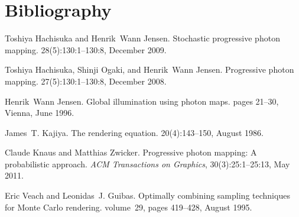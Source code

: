 \chapter{Bibliography}
\hypertarget{citelist}{}\label{citelist}

\begin{DoxyDescription}
\item[\label{citelist_CITEREF_Hachisuka:2009:Stochastic}%
\Hypertarget{citelist_CITEREF_Hachisuka:2009:Stochastic}%
\mbox{[}1\mbox{]}]Toshiya Hachisuka and Henrik~Wann Jensen. Stochastic progressive photon mapping. 28(5)\+:130\+:1--130\+:8, December 2009. 


\item[\label{citelist_CITEREF_Hachisuka:2008:Progressive}%
\Hypertarget{citelist_CITEREF_Hachisuka:2008:Progressive}%
\mbox{[}2\mbox{]}]Toshiya Hachisuka, Shinji Ogaki, and Henrik~Wann Jensen. Progressive photon mapping. 27(5)\+:130\+:1--130\+:8, December 2008. 


\item[\label{citelist_CITEREF_Jensen:1996:Global}%
\Hypertarget{citelist_CITEREF_Jensen:1996:Global}%
\mbox{[}3\mbox{]}]Henrik~Wann Jensen. Global illumination using photon maps. pages 21--30, Vienna, June 1996. 


\item[\label{citelist_CITEREF_Kajiya:1986:Rendering}%
\Hypertarget{citelist_CITEREF_Kajiya:1986:Rendering}%
\mbox{[}4\mbox{]}]James~T. Kajiya. The rendering equation. 20(4)\+:143--150, August 1986. 


\item[\label{citelist_CITEREF_Knaus:2011:Progressive}%
\Hypertarget{citelist_CITEREF_Knaus:2011:Progressive}%
\mbox{[}5\mbox{]}]Claude Knaus and Matthias Zwicker. Progressive photon mapping\+: A probabilistic approach. {\itshape ACM Transactions on Graphics}, 30(3)\+:25\+:1--25\+:13, May 2011. 


\item[\label{citelist_CITEREF_Veach:1995:Optimally}%
\Hypertarget{citelist_CITEREF_Veach:1995:Optimally}%
\mbox{[}6\mbox{]}]Eric Veach and Leonidas~J. Guibas. Optimally combining sampling techniques for Monte Carlo rendering. volume~29, pages 419--428, August 1995. 


\end{DoxyDescription}